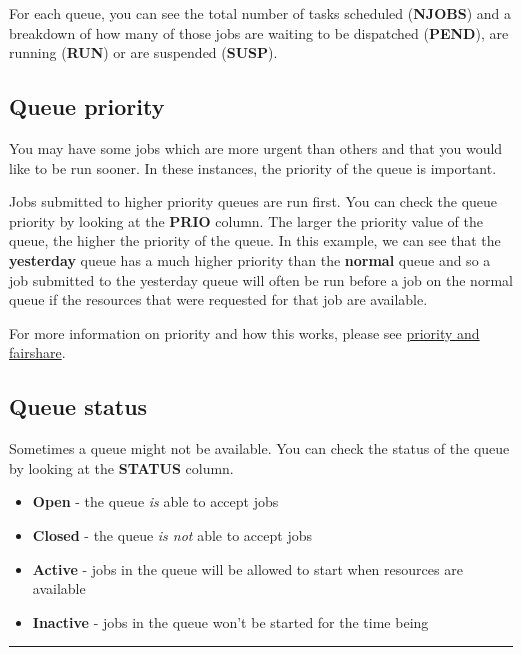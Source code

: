 \documentclass[11pt]{article}
\providecommand{\tightlist}{%
      \setlength{\itemsep}{0pt}\setlength{\parskip}{0pt}}
\begin{document}
For each queue, you can see the total number of tasks scheduled
(\textbf{NJOBS}) and a breakdown of how many of those jobs are waiting
to be dispatched (\textbf{PEND}), are running (\textbf{RUN}) or are
suspended (\textbf{SUSP}).

    \subsection{Queue priority}\label{queue-priority}

You may have some jobs which are more urgent than others and that you
would like to be run sooner. In these instances, the priority of the
queue is important.

Jobs submitted to higher priority queues are run first. You can check
the queue priority by looking at the \textbf{PRIO} column. The larger
the priority value of the queue, the higher the priority of the queue.
In this example, we can see that the \textbf{yesterday} queue has a much
higher priority than the \textbf{normal} queue and so a job submitted to
the yesterday queue will often be run before a job on the normal queue
if the resources that were requested for that job are available.

For more information on priority and how this works, please see
\href{priority_and_fairshare.ipynb}{priority and fairshare}.

    \subsection{Queue status}\label{queue-status}

Sometimes a queue might not be available. You can check the status of
the queue by looking at the \textbf{STATUS} column.

\begin{itemize}
\tightlist
\item
  \textbf{Open} - the queue \textit{is} able to accept jobs
\item
  \textbf{Closed} - the queue \textit{is not} able to accept jobs
\item
  \textbf{Active} - jobs in the queue will be allowed to start when
  resources are available
\item
  \textbf{Inactive} - jobs in the queue won't be started for the time
  being
\end{itemize}

    \begin{center}\rule{0.5\linewidth}{\linethickness}\end{center}
\end{document}
